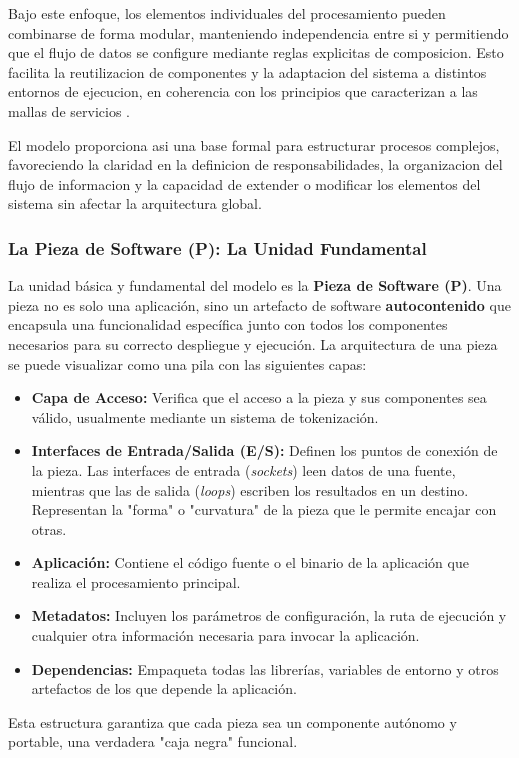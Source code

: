 Bajo este enfoque, los elementos individuales del procesamiento pueden combinarse de forma modular, manteniendo independencia entre si y permitiendo que el flujo de datos se configure mediante reglas explicitas de composicion. Esto facilita la reutilizacion de componentes y la adaptacion del sistema a distintos entornos de ejecucion, en coherencia con los principios que caracterizan a las mallas de servicios \cite{sanchez2021efficient}.

El modelo proporciona asi una base formal para estructurar procesos complejos, favoreciendo la claridad en la definicion de responsabilidades, la organizacion del flujo de informacion y la capacidad de extender o modificar los elementos del sistema sin afectar la arquitectura global.

\subsubsection{La Pieza de Software (P): La Unidad Fundamental}
La unidad básica y fundamental del modelo es la \textbf{Pieza de Software (P)}. Una pieza no es solo una aplicación, sino un artefacto de software \textbf{autocontenido} que encapsula una funcionalidad específica junto con todos los componentes necesarios para su correcto despliegue y ejecución. La arquitectura de una pieza se puede visualizar como una pila con las siguientes capas:
\begin{itemize}
    \item \textbf{Capa de Acceso:} Verifica que el acceso a la pieza y sus componentes sea válido, usualmente mediante un sistema de tokenización.
    \item \textbf{Interfaces de Entrada/Salida (E/S):} Definen los puntos de conexión de la pieza. Las interfaces de entrada (\textit{sockets}) leen datos de una fuente, mientras que las de salida (\textit{loops}) escriben los resultados en un destino. Representan la "forma" o "curvatura" de la pieza que le permite encajar con otras.
    \item \textbf{Aplicación:} Contiene el código fuente o el binario de la aplicación que realiza el procesamiento principal.
    \item \textbf{Metadatos:} Incluyen los parámetros de configuración, la ruta de ejecución y cualquier otra información necesaria para invocar la aplicación.
    \item \textbf{Dependencias:} Empaqueta todas las librerías, variables de entorno y otros artefactos de los que depende la aplicación.
\end{itemize}
Esta estructura garantiza que cada pieza sea un componente autónomo y portable, una verdadera "caja negra" funcional.

